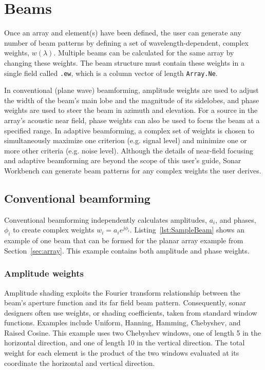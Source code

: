 \section{Beams}\label{sec:beam}

Once an array and element(s) have been defined, the user can generate any number of beam patterns by defining a set of wavelength-dependent, complex weights, $w(\lambda)$. Multiple beams can be calculated for the same array by changing these weights. The beam structure must contain these weights in a single field called \texttt{.ew}, which is a column vector of length \texttt{Array.Ne}.

In conventional (plane wave) beamforming, amplitude weights are used to adjust the width of the beam's main lobe and the magnitude of its sidelobes, and phase weights are used to steer the beam in azimuth and elevation. For a source in the array's acoustic near field, phase weights can also be used to focus the beam at a specified range. In adaptive beamforming, a complex set of weights is chosen to simultaneously maximize one criterion (e.g. signal level) and minimize one or more other criteria (e.g. noise level). Although the details of near-field focusing and adaptive beamforming are beyond the scope of this user's guide, Sonar Workbench can generate beam patterns for any complex weights the user derives.

\subsection{Conventional beamforming}

Conventional beamforming independently calculates amplitudes, $a_i$, and phases, $\phi_i$ to create complex weights $w_i=a_ie^{j\phi_i}$. Listing~\ref{lst:SampleBeam} shows an example of one beam that can be formed for the planar array example from Section~\ref{sec:array}. This example contains both amplitude and phase weights.



\subsubsection{Amplitude weights}

Amplitude shading exploits the Fourier transform relationship between the beam's aperture function and its far field beam pattern. Consequently, sonar designers often use weights, or shading coefficients, taken from standard window functions. Examples include Uniform, Hanning, Hamming, Chebyshev, and Raised Cosine. This example uses two Chebyshev windows, one of length 5 in the horizontal direction, and one of length 10 in the vertical direction. The total weight for each element is the product of the two windows evaluated at its coordinate the horizontal and vertical direction.

